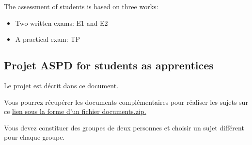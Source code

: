 \documentclass[ 12pt]{article}
\begin{document}
The assessment  of students is based on three works:
\begin{itemize}
\item Two  written  exams: E1 and E2
\item  A practical exam: TP
 \end{itemize}


  \subsection{Projet ASPD for students as apprentices}
\label{sec:project}

Le  projet est décrit   dans ce
\href{http://mery54.github.io/teaching/aspd/lecturesnotes/projetaspd2025.pdf}{document}.

Vous pourrez  récupérer les  documents  complémentaires  pour réaliser
les sujets sur ce \href{http://mery54.github.io/teaching/aspd/lecturesnotes/documents.zip}{ lien  sous la forme  d'un fichier documents.zip.}



Vous devez  constituer des groupes de deux personnes   et choisir un
sujet  différent pour chaque groupe.





\end{document}

